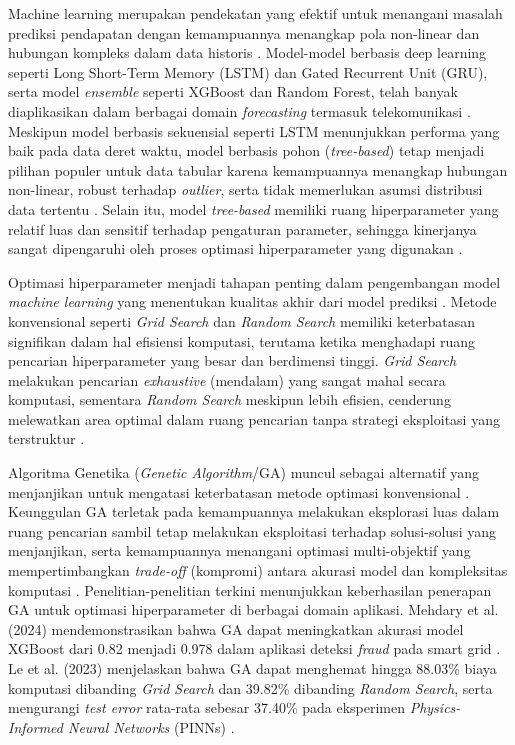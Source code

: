     Machine learning merupakan pendekatan yang efektif untuk menangani masalah prediksi pendapatan dengan kemampuannya menangkap pola non-linear dan hubungan kompleks dalam data historis \cite{DiFrancescomarino2018GAHyperparameter, Wu2022ParallelGA}. Model-model berbasis deep learning seperti Long Short-Term Memory (LSTM) dan Gated Recurrent Unit (GRU), serta model \textit{ensemble} seperti XGBoost dan Random Forest, telah banyak diaplikasikan dalam berbagai domain \textit{forecasting} termasuk telekomunikasi \cite{Wu2022ParallelGA, mehdary2024}. Meskipun model berbasis sekuensial seperti LSTM menunjukkan performa yang baik pada data deret waktu, model berbasis pohon (\textit{tree-based}) tetap menjadi pilihan populer untuk data tabular karena kemampuannya menangkap hubungan non-linear, robust terhadap \textit{outlier}, serta tidak memerlukan asumsi distribusi data tertentu \cite{grinsztajn2022treebasedmodelsoutperformdeep, Chen2016}. Selain itu, model \textit{tree-based} memiliki ruang hiperparameter yang relatif luas dan sensitif terhadap pengaturan parameter, sehingga kinerjanya sangat dipengaruhi oleh proses optimasi hiperparameter yang digunakan \cite{Probst2019Hyperparameters}.

    Optimasi hiperparameter menjadi tahapan penting dalam pengembangan model \textit{machine learning} yang menentukan kualitas akhir dari model prediksi \cite{Morales2022SurveyMOHPO}. Metode konvensional seperti \textit{Grid Search} dan \textit{Random Search} memiliki keterbatasan signifikan dalam hal efisiensi komputasi, terutama ketika menghadapi ruang pencarian hiperparameter yang besar dan berdimensi tinggi. \textit{Grid Search} melakukan pencarian \textit{exhaustive} (mendalam) yang sangat mahal secara komputasi, sementara \textit{Random Search} meskipun lebih efisien, cenderung melewatkan area optimal dalam ruang pencarian tanpa strategi eksploitasi yang terstruktur \cite{Le2023PINNGA}.
    
    Algoritma Genetika (\textit{Genetic Algorithm}/GA) muncul sebagai alternatif yang menjanjikan untuk mengatasi keterbatasan metode optimasi konvensional \cite{Ghatasheh2022ModifiedGA,Deighan2021GANNGravWave}. Keunggulan GA terletak pada kemampuannya melakukan eksplorasi luas dalam ruang pencarian sambil tetap melakukan eksploitasi terhadap solusi-solusi yang menjanjikan, serta kemampuannya menangani optimasi multi-objektif yang mempertimbangkan \textit{trade-off} (kompromi) antara akurasi model dan kompleksitas komputasi \cite{Kobayashi2024DQN_BRKGA, Truong2021TelecomRevenue}. Penelitian-penelitian terkini menunjukkan keberhasilan penerapan GA untuk optimasi hiperparameter di berbagai domain aplikasi. Mehdary et al. (2024) mendemonstrasikan bahwa GA dapat meningkatkan akurasi model XGBoost dari 0.82 menjadi 0.978 dalam aplikasi deteksi \textit{fraud} pada smart grid \cite{Mehdary2024GA_XGBoost}. Le et al. (2023) menjelaskan bahwa GA dapat menghemat hingga 88.03\% biaya komputasi dibanding \textit{Grid Search} dan 39.82\% dibanding \textit{Random Search}, serta mengurangi \textit{test error} rata-rata sebesar 37.40\% pada eksperimen \textit{Physics-Informed Neural Networks} (PINNs) \cite{Le2023PINNGA}.
    

